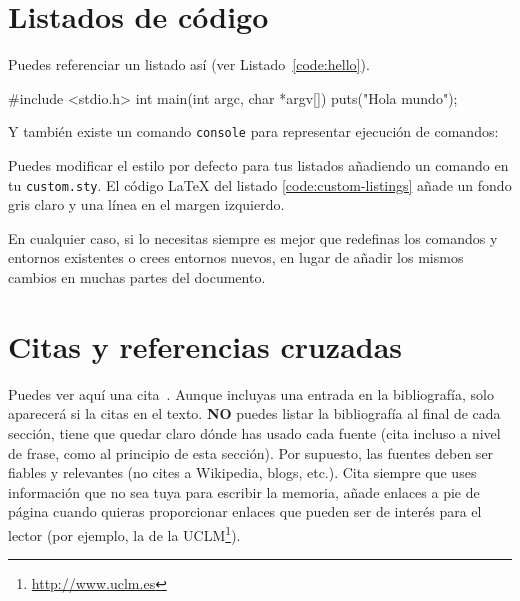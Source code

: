 \section{Listados de código}
\label{sec:listado}

\noindent
Puedes referenciar un listado así (ver Listado~\ref{code:hello}).

\begin{listing}[
  float=ht,
  language = C,
  caption  = {«Hola mundo» en C},
  label    = code:hello]
#include <stdio.h>
int main(int argc, char *argv[]) {
    puts("Hola mundo\n");
}
\end{listing}

Y también existe un comando \texttt{console} para representar ejecución de comandos:


Puedes modificar el estilo por defecto para tus listados añadiendo un comando  en tu \texttt{custom.sty}. El código \LaTeX{} del listado \ref{code:custom-listings} añade un fondo gris claro y una línea en el margen izquierdo.

\begin{listing}[
  float=h!,
  caption  = {Personalizando los listados de código},
  label    = code:custom-listings]
\end{listing}

En cualquier caso, si lo necesitas siempre es mejor que redefinas los comandos y entornos existentes o crees entornos nuevos, en lugar de añadir los mismos cambios en muchas partes del documento.


\section{Citas y referencias cruzadas}

Puedes ver aquí una cita~\cite{design_patterns}. Aunque incluyas una entrada en la bibliografía, solo aparecerá si la citas en el texto. \textbf{NO} puedes listar la bibliografía al final de cada sección, tiene que quedar claro dónde has usado cada fuente (cita incluso a nivel de frase, como al principio de esta sección). Por supuesto, las fuentes deben ser fiables y relevantes (no cites a Wikipedia, blogs, etc.). Cita siempre que uses información que no sea tuya para escribir la memoria, añade enlaces a pie de página cuando quieras proporcionar enlaces que pueden ser de interés para el lector (por ejemplo, la de la \acs{UCLM}\footnote{\url{http://www.uclm.es}}).

